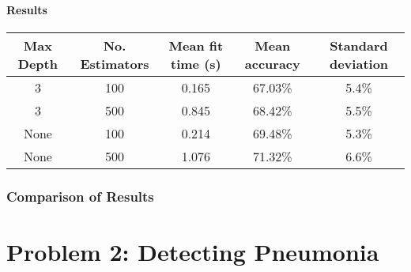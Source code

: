 \documentclass[12pt,a4paper,titlepage,twoside]{report}
\begin{document}
\subsubsection*{Results}

	\begin{table}
		\centering
		\begin{tabular}{|c|c|c|c|c|}
			\hline
			\textbf{Max Depth} 	& \textbf{No. Estimators} & \textbf{Mean fit time} (s) 	& \textbf{Mean accuracy} 	& \textbf{Standard deviation}	\\ 
			\hline
			3 		& 100 	& 0.165 	& 67.03\%  & 5.4\% \\
			3 		& 500 	& 0.845 	& 68.42\%  & 5.5\% \\
			None 	& 100 	& 0.214 	& 69.48\%  & 5.3\% \\
			None 	& 500 	& 1.076 	& 71.32\%  & 6.6\% \\
			\hline
		\end{tabular}
	\end{table}
	
\subsection{Comparison of Results}

\chapter{Problem 2: Detecting Pneumonia}
\end{document}
